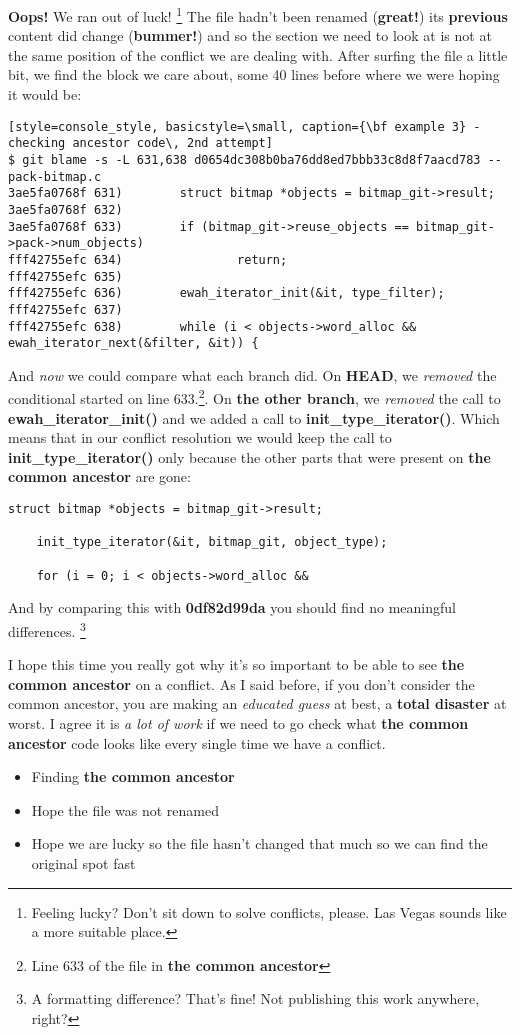 {\bf Oops!} We ran out of luck! \footnote{Feeling lucky? Don't sit down to solve conflicts, please. Las Vegas sounds like a more
suitable place.}  The file hadn't been renamed ({\bf great!}) its {\bf previous} content did change ({\bf bummer!}) and so the
section we need to look at is not at the same position of the conflict we are dealing with. After surfing the file a little bit,
we find the block we care about, some 40 lines before where we were hoping it would be:

\begin{lstlisting}[style=console_style, basicstyle=\small, caption={\bf example 3} - checking ancestor code\, 2nd attempt]
$ git blame -s -L 631,638 d0654dc308b0ba76dd8ed7bbb33c8d8f7aacd783 -- pack-bitmap.c
3ae5fa0768f 631)        struct bitmap *objects = bitmap_git->result;
3ae5fa0768f 632) 
3ae5fa0768f 633)        if (bitmap_git->reuse_objects == bitmap_git->pack->num_objects)
fff42755efc 634)                return;
fff42755efc 635) 
fff42755efc 636)        ewah_iterator_init(&it, type_filter);
fff42755efc 637) 
fff42755efc 638)        while (i < objects->word_alloc && ewah_iterator_next(&filter, &it)) {
\end{lstlisting}

And {\it now} we could compare what each branch did. On {\bf HEAD}, we {\it removed} the conditional started on
line 633.\footnote{Line 633 of the file in {\bf the common ancestor}}. On {\bf the other branch}, we {\it removed} the call
to {\bf ewah\_iterator\_init()} and we added a call to {\bf init\_type\_iterator()}. Which means that in our conflict resolution
we would keep the call to {\bf init\_type\_iterator()} only because the other parts that were present on {\bf the common ancestor}
are gone:

\begin{lstlisting}[style=c_style, firstnumber=671, caption={\bf example 3} - final resolution]
	struct bitmap *objects = bitmap_git->result;

	init_type_iterator(&it, bitmap_git, object_type);

	for (i = 0; i < objects->word_alloc &&
\end{lstlisting}

And by comparing this with {\bf 0df82d99da} you should find no meaningful differences. \footnote{A formatting difference? That's fine! Not publishing this work anywhere, right?}

I hope this time you really got why it's so important to be able to see {\bf the common ancestor} on a conflict. As I said before, if you
don't consider the common ancestor, you are making an {\it educated guess} at best, a {\bf total disaster} at worst. I agree it
is {\it a lot of work} if we need to go check what {\bf the common ancestor} code looks like every single time we have a conflict.
\begin{itemize}
	\item Finding {\bf the common ancestor}
	\item Hope the file was not renamed
	\item Hope we are lucky so the file hasn't changed that much so we can find the original spot fast
\end{itemize}

